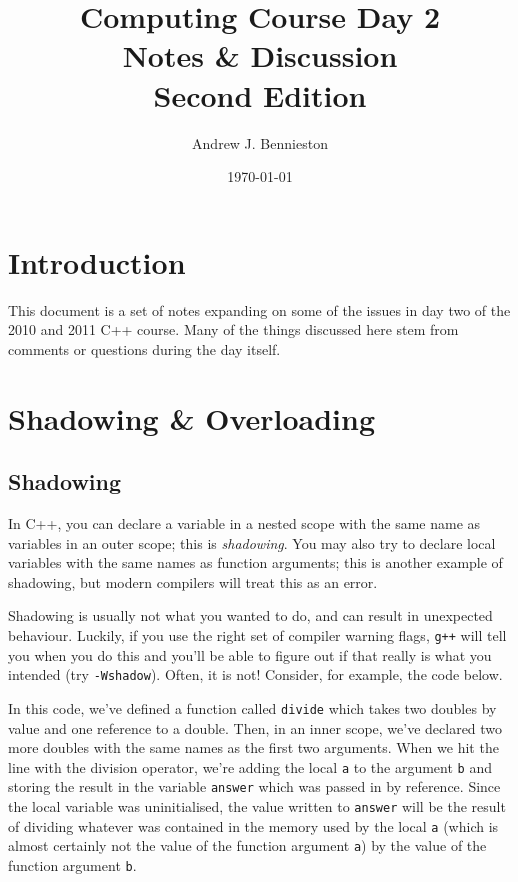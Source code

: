 \documentclass[a4paper]{scrartcl}
\title{Computing Course Day 2\\
Notes \& Discussion\\
Second Edition}
\author{Andrew J. Bennieston}
\date{\today}
\begin{document}
\maketitle

\tableofcontents

\pagebreak

\section{Introduction}
This document is a set of notes expanding on some of the issues in day two of the 2010 and 2011 C++ course. Many of the things discussed here stem from comments or questions during the day itself.

\section{Shadowing \& Overloading}
\subsection{Shadowing}
In C++, you can declare a variable in a nested scope with the same name as variables in an outer scope; this is \emph{shadowing}. You may also try to declare local variables with the same names as function arguments; this is another example of shadowing, but modern compilers will treat this as an error.

Shadowing is usually not what you wanted to do, and can result in unexpected behaviour. Luckily, if you use the right set of compiler warning flags, \verb|g++| will tell you when you do this and you'll be able to figure out if that really is what you intended (try \texttt{-Wshadow}). Often, it is not! Consider, for example, the code below.



In this code, we've defined a function called \verb|divide| which takes two doubles by value and one reference to a double. Then, in an inner scope, we've declared two more doubles with the same names as the first two arguments. When we hit the line with the division operator, we're adding the local \verb|a| to the argument \verb|b| and storing the result in the variable \verb|answer| which was passed in by reference. Since the local variable was uninitialised, the value written to \verb|answer| will be the result of dividing whatever was contained in the memory used by the local \verb|a| (which is almost certainly not the value of the function argument \verb|a|) by the value of the function argument \verb|b|.
\end{document}
